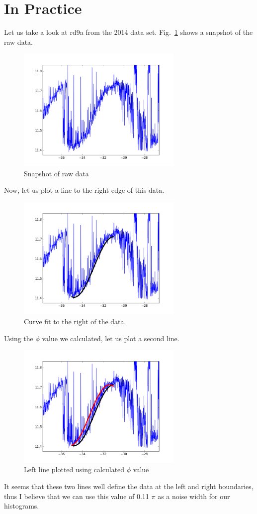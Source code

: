 \documentclass[]{article}
\begin{document}
\section*{In Practice}
Let us take a look at rd9a from the 2014 data set. Fig.~\ref{datasnap} shows a snapshot of the raw data.
\begin{figure}[H]
	\centering
	\includegraphics[width=8cm]{datasnap.png} 
	\caption{Snapshot of raw data}
	\label{datasnap}
\end{figure} 
Now, let us plot a line to the right edge of this data.
\begin{figure}[H]
	\centering
	\includegraphics[width=8cm]{line1snap.png} 
	\caption{Curve fit to the right of the data}
	\label{line1snap}
\end{figure}
Using the $\phi$ value we calculated, let us plot a second line.
\begin{figure}[H]
	\centering
	\includegraphics[width=8cm]{line2snap.png} 
	\caption{Left line plotted using calculated $\phi$ value}
	\label{line2snap}
\end{figure}
It seems that these two lines well define the data at the left and right boundaries, thus I believe that we can use this value of 0.11 $\pi$ as a noise width for our histograms.
\end{document}
